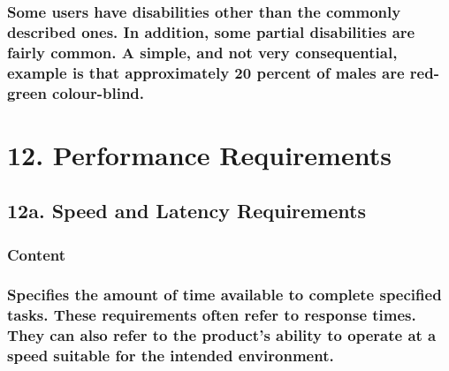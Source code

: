 \documentclass[
]{article}
\begin{document}
\hypertarget{some-users-have-disabilities-other-than-the-commonly-described-ones.-in-addition-some-partial-disabilities-are-fairly-common.-a-simple-and-not-very-consequential-example-is-that-approximately-20-percent-of-males-are-red-green-colour-blind.}{%
\subsubsection{\texorpdfstring{Some users have disabilities other than
the commonly described ones. In addition, some partial disabilities are
fairly common. A simple, and not very consequential, example is that
approximately 20 percent of males are red-green colour-blind.
}{Some users have disabilities other than the commonly described ones. In addition, some partial disabilities are fairly common. A simple, and not very consequential, example is that approximately 20 percent of males are red-green colour-blind. }}\label{some-users-have-disabilities-other-than-the-commonly-described-ones.-in-addition-some-partial-disabilities-are-fairly-common.-a-simple-and-not-very-consequential-example-is-that-approximately-20-percent-of-males-are-red-green-colour-blind.}}

\hypertarget{performance-requirements}{%
\section{12. Performance Requirements}\label{performance-requirements}}

\hypertarget{a.-speed-and-latency-requirements}{%
\subsection{12a. Speed and Latency
Requirements}\label{a.-speed-and-latency-requirements}}

\hypertarget{content-37}{%
\subsubsection{Content}\label{content-37}}

\hypertarget{specifies-the-amount-of-time-available-to-complete-specified-tasks.-these-requirements-often-refer-to-response-times.-they-can-also-refer-to-the-products-ability-to-operate-at-a-speed-suitable-for-the-intended-environment.}{%
\subsubsection{Specifies the amount of time available to complete
specified tasks. These requirements often refer to response times. They
can also refer to the product's ability to operate at a speed suitable
for the intended
environment.}\label{specifies-the-amount-of-time-available-to-complete-specified-tasks.-these-requirements-often-refer-to-response-times.-they-can-also-refer-to-the-products-ability-to-operate-at-a-speed-suitable-for-the-intended-environment.}}
\end{document}
